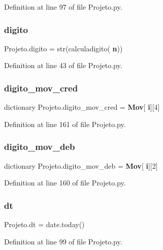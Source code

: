 Definition at line 97 of file Projeto.\+py.

\mbox{\label{namespace_projeto_a2a52fe65086198d75f2c72ee60c7fa36}} 
\subsubsection{digito}
{\footnotesize\ttfamily Projeto.\+digito = str(calculadigito(\textbf{ n}))}



Definition at line 43 of file Projeto.\+py.

\mbox{\label{namespace_projeto_a7e7a81ba7f60bebdb54494c704704323}} 
\subsubsection{digito\_mov\_cred}
{\footnotesize\ttfamily dictionary Projeto.\+digito\+\_\+mov\+\_\+cred = \textbf{ Mov}[\textbf{ i}][4]}



Definition at line 161 of file Projeto.\+py.

\mbox{\label{namespace_projeto_a37877b09dbd85be74f94486887a769c8}} 
\subsubsection{digito\_mov\_deb}
{\footnotesize\ttfamily dictionary Projeto.\+digito\+\_\+mov\+\_\+deb = \textbf{ Mov}[\textbf{ i}][2]}



Definition at line 160 of file Projeto.\+py.

\mbox{\label{namespace_projeto_af9114eb98958231b212b7ff37cfcddb7}} 
\subsubsection{dt}
{\footnotesize\ttfamily Projeto.\+dt = date.\+today()}



Definition at line 99 of file Projeto.\+py.

\mbox{\label{namespace_projeto_a349e7a873a74aec3aa35497099a913dc}} 
